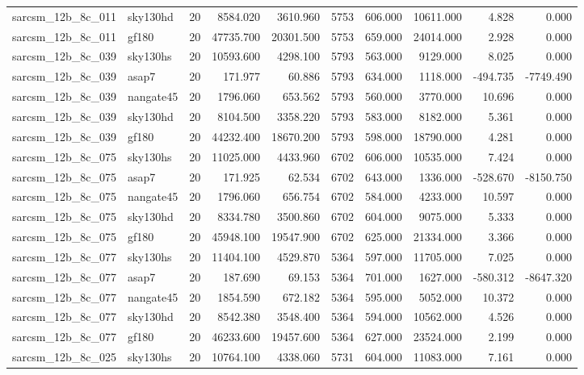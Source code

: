 \begin{tabular}{llrrrrrrrr}
sarcsm\_12b\_8c\_011 & sky130hd & 20 & 8584.020 & 3610.960 & 5753 & 606.000 & 10611.000 & 4.828 & 0.000 \\
sarcsm\_12b\_8c\_011 & gf180 & 20 & 47735.700 & 20301.500 & 5753 & 659.000 & 24014.000 & 2.928 & 0.000 \\
sarcsm\_12b\_8c\_039 & sky130hs & 20 & 10593.600 & 4298.100 & 5793 & 563.000 & 9129.000 & 8.025 & 0.000 \\
sarcsm\_12b\_8c\_039 & asap7 & 20 & 171.977 & 60.886 & 5793 & 634.000 & 1118.000 & -494.735 & -7749.490 \\
sarcsm\_12b\_8c\_039 & nangate45 & 20 & 1796.060 & 653.562 & 5793 & 560.000 & 3770.000 & 10.696 & 0.000 \\
sarcsm\_12b\_8c\_039 & sky130hd & 20 & 8104.500 & 3358.220 & 5793 & 583.000 & 8182.000 & 5.361 & 0.000 \\
sarcsm\_12b\_8c\_039 & gf180 & 20 & 44232.400 & 18670.200 & 5793 & 598.000 & 18790.000 & 4.281 & 0.000 \\
sarcsm\_12b\_8c\_075 & sky130hs & 20 & 11025.000 & 4433.960 & 6702 & 606.000 & 10535.000 & 7.424 & 0.000 \\
sarcsm\_12b\_8c\_075 & asap7 & 20 & 171.925 & 62.534 & 6702 & 643.000 & 1336.000 & -528.670 & -8150.750 \\
sarcsm\_12b\_8c\_075 & nangate45 & 20 & 1796.060 & 656.754 & 6702 & 584.000 & 4233.000 & 10.597 & 0.000 \\
sarcsm\_12b\_8c\_075 & sky130hd & 20 & 8334.780 & 3500.860 & 6702 & 604.000 & 9075.000 & 5.333 & 0.000 \\
sarcsm\_12b\_8c\_075 & gf180 & 20 & 45948.100 & 19547.900 & 6702 & 625.000 & 21334.000 & 3.366 & 0.000 \\
sarcsm\_12b\_8c\_077 & sky130hs & 20 & 11404.100 & 4529.870 & 5364 & 597.000 & 11705.000 & 7.025 & 0.000 \\
sarcsm\_12b\_8c\_077 & asap7 & 20 & 187.690 & 69.153 & 5364 & 701.000 & 1627.000 & -580.312 & -8647.320 \\
sarcsm\_12b\_8c\_077 & nangate45 & 20 & 1854.590 & 672.182 & 5364 & 595.000 & 5052.000 & 10.372 & 0.000 \\
sarcsm\_12b\_8c\_077 & sky130hd & 20 & 8542.380 & 3548.400 & 5364 & 594.000 & 10562.000 & 4.526 & 0.000 \\
sarcsm\_12b\_8c\_077 & gf180 & 20 & 46233.600 & 19457.600 & 5364 & 627.000 & 23524.000 & 2.199 & 0.000 \\
sarcsm\_12b\_8c\_025 & sky130hs & 20 & 10764.100 & 4338.060 & 5731 & 604.000 & 11083.000 & 7.161 & 0.000 \\

\end{tabular}
